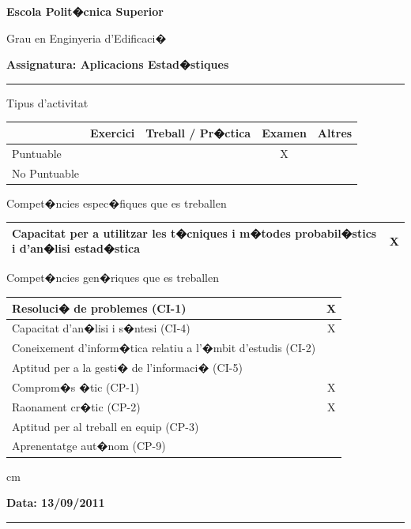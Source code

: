 \documentclass[a4paper,10pt]{article}
\begin{document}
\noindent
{\large \bf Escola Polit�cnica Superior}

\noindent
{\large Grau en Enginyeria d'Edificaci�}

\vskip 0.3cm
\noindent
{\large \bf Assignatura: Aplicacions Estad�stiques}

\hrule

\vskip 0.3cm

\noindent
Tipus d'activitat

\begin{tabular}{|l|c|c|c|c|}
\hline
 & Exercici & Treball / Pr�ctica & Examen & Altres \\
\hline
Puntuable & & & X & \\ \hline
No Puntuable & & & & \\ \hline
\end{tabular}

\vskip 0.3cm

\noindent
Compet�ncies espec�fiques que es treballen

\begin{tabular}{|l|c|}
\hline
Capacitat per a utilitzar les t�cniques i m�todes probabil�stics i d'an�lisi estad�stica & X \\
\hline
\end{tabular}

\vskip 0.3cm

\noindent
Compet�ncies gen�riques que es treballen

\begin{tabular}{|l|c|}
\hline
Resoluci� de problemes (CI-1) & X \\ \hline
Capacitat d'an�lisi i s�ntesi (CI-4) & X \\ \hline
Coneixement d'inform�tica relatiu a l'�mbit d'estudis (CI-2) & \\ \hline
Aptitud per a la gesti� de l'informaci� (CI-5) & \\ \hline
Comprom�s �tic (CP-1) & X \\ \hline
Raonament cr�tic (CP-2) & X \\ \hline
Aptitud per al treball en equip (CP-3) & \\ \hline
Aprenentatge aut�nom (CP-9) & \\ \hline
\end{tabular}


 cm

\noindent
\textbf{Data: 13/09/2011}

\hrule

\vskip 1cm
\end{document}
